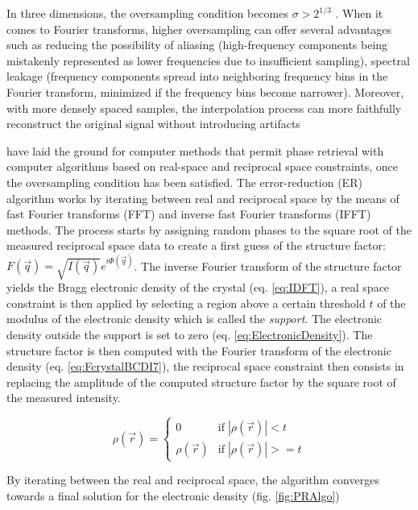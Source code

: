 In three dimensions, the oversampling condition becomes $\sigma>2^{1/3}$ \parencite{Miao1998, Miao2000, miao_possible_2000}.
When it comes to Fourier transforms, higher oversampling can offer several advantages such as reducing the possibility of aliasing (high-frequency components being mistakenly represented as lower frequencies due to insufficient sampling), spectral leakage (frequency components spread into neighboring frequency bins in the Fourier transform, minimized if the frequency bins become narrower).
Moreover, with more densely spaced samples, the interpolation process can more faithfully reconstruct the original signal without introducing artifacts

\cite{fienup_reconstruction_1978, Fienup1982, Fienup1986} have laid the ground for computer methods that permit phase retrieval with computer algorithms based on real-space and reciprocal space constraints, once the oversampling condition has been satisfied.
The error-reduction (ER) algorithm works by iterating between real and reciprocal space by the means of fast Fourier transforms (FFT) and inverse fast Fourier transforms (IFFT) methods.
The process starts by assigning random phases to the square root of the measured reciprocal space data to create a first guess of the structure factor: $F(\vec{q}) = \sqrt{I(\vec{q})}e^{i\Phi(\vec{q})}$.
The inverse Fourier transform of the structure factor yields the Bragg electronic density of the crystal (eq. \ref{eq:IDFT}), a real space constraint is then applied by selecting a region above a certain threshold $t$ of the modulus of the electronic density which is called the \textit{support}.
The electronic density outside the support is set to zero (eq. \ref{eq:ElectronicDensity}).
The structure factor is then computed with the Fourier transform of the electronic density (eq. \ref{eq:FcrystalBCDI7}), the reciprocal space constraint then consists in replacing the amplitude of the computed structure factor by the square root of the measured intensity.

\begin{equation}
    \label{eq:ElectronicDensity}
    \rho(\vec{r}) =
        \begin{cases}
            0  & \text{if} \; |\rho(\vec{r})| < t \\
            \rho(\vec{r}) & \text{if}  \; |\rho(\vec{r})| >= t
        \end{cases}
\end{equation}

By iterating between the real and reciprocal space, the algorithm converges towards a final solution for the electronic density (fig. \ref{fig:PRAlgo})

